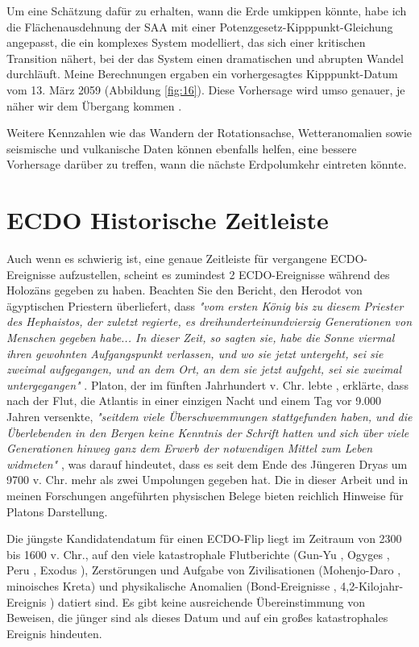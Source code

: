 \documentclass[10pt,twocolumn,letterpaper]{article}
\begin{document}
Um eine Schätzung dafür zu erhalten, wann die Erde umkippen könnte, habe ich die Flächenausdehnung der SAA mit einer Potenzgesetz-Kipppunkt-Gleichung angepasst, die ein komplexes System modelliert, das sich einer kritischen Transition nähert, bei der das System einen dramatischen und abrupten Wandel durchläuft. Meine Berechnungen ergaben ein vorhergesagtes Kipppunkt-Datum vom 13. März 2059 (Abbildung \ref{fig:16}). Diese Vorhersage wird umso genauer, je näher wir dem Übergang kommen \cite{136}.

Weitere Kennzahlen wie das Wandern der Rotationsachse, Wetteranomalien sowie seismische und vulkanische Daten können ebenfalls helfen, eine bessere Vorhersage darüber zu treffen, wann die nächste Erdpolumkehr eintreten könnte.

\section{ECDO Historische Zeitleiste}

Auch wenn es schwierig ist, eine genaue Zeitleiste für vergangene ECDO-Ereignisse aufzustellen, scheint es zumindest 2 ECDO-Ereignisse während des Holozäns gegeben zu haben. Beachten Sie den Bericht, den Herodot von ägyptischen Priestern überliefert, dass \textit{"vom ersten König bis zu diesem Priester des Hephaistos, der zuletzt regierte, es dreihunderteinundvierzig Generationen von Menschen gegeben habe... In dieser Zeit, so sagten sie, habe die Sonne viermal ihren gewohnten Aufgangspunkt verlassen, und wo sie jetzt untergeht, sei sie zweimal aufgegangen, und an dem Ort, an dem sie jetzt aufgeht, sei sie zweimal untergegangen"} \cite{32}. Platon, der im fünften Jahrhundert v. Chr. lebte \cite{111}, erklärte, dass nach der Flut, die Atlantis in einer einzigen Nacht und einem Tag vor 9.000 Jahren versenkte, \textit{"seitdem viele Überschwemmungen stattgefunden haben, und die Überlebenden in den Bergen keine Kenntnis der Schrift hatten und sich über viele Generationen hinweg ganz dem Erwerb der notwendigen Mittel zum Leben widmeten"} \cite{112}, was darauf hindeutet, dass es seit dem Ende des Jüngeren Dryas um 9700 v. Chr. mehr als zwei Umpolungen gegeben hat. Die in dieser Arbeit und in meinen Forschungen angeführten physischen Belege \cite{2} bieten reichlich Hinweise für Platons Darstellung.

Die jüngste Kandidatendatum für einen ECDO-Flip liegt im Zeitraum von 2300 bis 1600 v. Chr., auf den viele katastrophale Flutberichte (Gun-Yu \cite{113,114,115}, Ogyges \cite{116,117}, Peru \cite{118,119}, Exodus \cite{120}), Zerstörungen und Aufgabe von Zivilisationen (Mohenjo-Daro \cite{121}, minoisches Kreta\cite{100,101}) und physikalische Anomalien (Bond-Ereignisse \cite{122}, 4,2-Kilojahr-Ereignis \cite{90}) datiert sind. Es gibt keine ausreichende Übereinstimmung von Beweisen, die jünger sind als dieses Datum und auf ein großes katastrophales Ereignis hindeuten.
\end{document}
